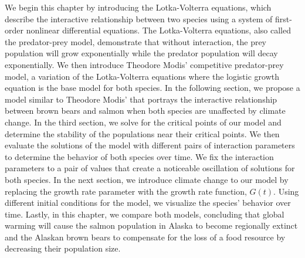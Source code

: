 We begin this chapter by introducing the Lotka-Volterra equations, which describe the interactive relationship between two species using a system of first-order nonlinear differential equations.
The Lotka-Volterra equations, also called the predator-prey model, demonstrate that without interaction, the prey population will grow exponentially while the predator population will decay exponentially.
We then introduce Theodore Modis' competitive predator-prey model, a variation of the Lotka-Volterra equations where the logistic growth equation is the base model for both species.
In the following section, we propose a model similar to Theodore Modis' that portrays the interactive relationship between brown bears and salmon when both species are unaffected by climate change.
In the third section, we solve for the critical points of our model and determine the stability of the populations near their critical points.
We then evaluate the solutions of the model with different pairs of interaction parameters to determine the behavior of both species over time.
We fix the interaction parameters to a pair of values that create a noticeable oscillation of solutions for both species.
In the next section, we introduce climate change to our model by replacing the growth rate parameter with the growth rate function, $G(t)$.
Using different initial conditions for the model, we visualize the species' behavior over time.
Lastly, in this chapter, we compare both models, concluding that global warming will cause the salmon population in Alaska to become regionally extinct and the Alaskan brown bears to compensate for the loss of a food resource by decreasing their population size.